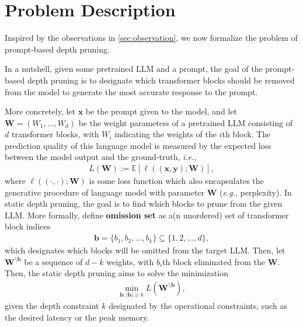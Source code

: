 \section{Problem Description}\label{sec:formulation}
Inspired by the observations in \cref{sec:observation}, we now formalize the problem of prompt-based depth pruning.

In a nutshell, given some pretrained LLM and a prompt, the goal of the prompt-based depth pruning is to designate which transformer blocks should be removed from the model to generate the most accurate response to the prompt.


More concretely, let $\mathbf{x}$ be the prompt given to the model, and let $\mathbf{W} = (W_1,\ldots,W_d)$ be the weight parameters of a pretrained LLM consisting of $d$ transformer blocks, with $W_i$ indicating the weights of the $i$th block. The prediction quality of this language model is measured by the expected loss between the model output and the ground-truth, \textit{i.e.},
\begin{align}
L(\mathbf{W}) := \mathbb{E}[\ell((\mathbf{x},\mathbf{y});\mathbf{W})],\label{eq:risk}
\end{align}
where $\ell((\cdot,\cdot);\mathbf{W})$ is some loss function which also encapsulates the generative procedure of language model with parameter $\mathbf{W}$ (\textit{e.g.}, perplexity). In static depth pruning, the goal is to find which blocks to prune from the given LLM. More formally, define \textbf{omission set} as a(n unordered) set of transformer block indices
\begin{align}
\mathbf{b} = \{b_1,b_2,\ldots,b_k\} \subseteq \{1,2,\ldots,d\},
\end{align}
which designates which blocks will be omitted from the target LLM. Then, let $\mathbf{W}^{\setminus \mathbf{b}}$ be a sequence of $d-k$ weights, with $b_i$th block eliminated from the $\mathbf{W}$. Then, the static depth pruning aims to solve the minimization
\begin{align}
\min_{\mathbf{b}:|\mathbf{b}| \ge k} L(\mathbf{W}^{\setminus \mathbf{b}}) \label{eq:static_depth_pruning},
\end{align}
given the depth constraint $k$ designated by the operational constraints, such as the desired latency or the peak memory.

